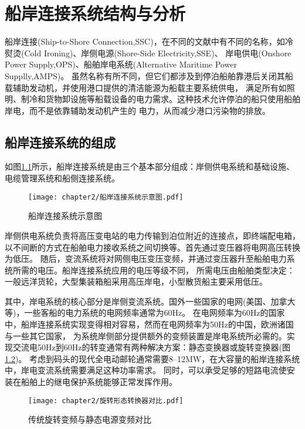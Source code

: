 \chapter{船岸连接系统结构与分析}

船岸连接(Ship-to-Shore Connection,SSC)，在不同的文献中有不同的名称，如冷熨烫(Cold Ironing)、岸侧电源(Shore-Side Electricity,SSE)、
岸电供电(Onshore Power Supply,OPS)、船舶岸电系统(Alternative Maritime Power Supplly,AMPS)。
虽然名称有所不同，但它们都涉及到停泊船舶靠港后关闭其船载辅助发动机，并使用港口提供的清洁能源为船载主要系统供电，
满足所有如照明、制冷和货物卸设施等船载设备的电力需求。这种技术允许停泊的船只使用船舶岸电，而不是依靠辅助发动机产生的
电力，从而减少港口污染物的排放。

\section{船岸连接系统的组成}

如图\ref{fig:船岸连接系统示意图}所示，船岸连接系统是由三个基本部分组成：岸侧供电系统和基础设施、电缆管理系统和船侧连接系统。

\begin{figure}[!htp]
	\centering
	\texttt{[image: chapter2/船岸连接系统示意图.pdf]}
	\caption{船岸连接系统示意图}
	\label{fig:船岸连接系统示意图}
\end{figure}

岸侧供电系统负责将高压变电站的电力传输到泊位附近的连接点，即终端配电箱，以不间断的方式在船舶电力接收系统之间切换等。首先通过变压器将电网高压转换为低压。
随后，变流系统将对网侧电压变压变频，并通过变压器升至船舶电力系统所需的电压。船岸连接系统应用的电压等级不同，
所需电压由船舶类型决定：一般远洋货轮，大型集装箱船采用高压岸电，小型散货船主要采用低压。

其中，岸电系统的核心部分是岸侧变流系统。国外一些国家的电网(美国、加拿大等)，一些客船的电力系统的电网频率通常为60Hz。
在电网频率为60Hz的国家中，船岸连接系统实现变得相对容易，然而在电网频率为50Hz的中国，欧洲诸国与一些其它国家，
为系统岸侧部分提供额外的变频装置是岸电系统所必需的。实现交流电50Hz到60Hz的转变通常有两种解决方案：静态变换器或旋转变换器(图\ref{fig:传统旋转变频与静态电源变频对比})。
考虑到码头的现代全电动邮轮通常需要8–12\si{MW}\cite{SP15}，在大容量的船岸连接系统中，岸电变流系统需要满足这种功率需求。
同时，可以承受足够的短路电流使安装在船舶上的继电保护系统能够正常发挥作用。

\begin{figure}[!htp]
	\centering
	\texttt{[image: chapter2/旋转形态转换器对比.pdf]}
	\caption{传统旋转变频与静态电源变频对比}
	\label{fig:传统旋转变频与静态电源变频对比}
\end{figure}

